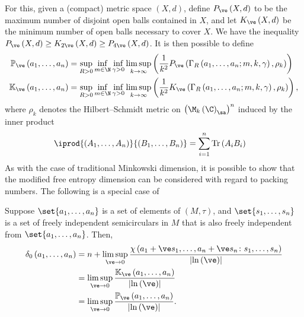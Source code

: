 \documentclass[10pt]{mypackage}
\begin{document}
For this, given a (compact) metric space $\left( X,d \right)$, define $P_{\ve}\left( X,d \right)$ to be the maximum number of disjoint open balls contained in $X$, and let $K_{\ve}\left( X,d \right)$ be the minimum number of open balls necessary to cover $X$. We have the inequality $P_{\ve}\left( X,d \right) \geq K_{2\ve}\left( X,d \right)\geq P_{4\ve}\left( X,d \right)$. It is then possible to define
\begin{align*}
  \mathbb{P}_{\ve}\left( a_1,\dots,a_n \right) &= \sup_{R > 0}\inf_{m\in\N}\inf_{\gamma > 0}\limsup_{k\rightarrow\infty}\left( \frac{1}{k^2}P_{\ve}\left( \Gamma_{R}\left( a_1,\dots,a_n;m,k,\gamma \right),\rho_k \right) \right)\\
  \mathbb{K}_{\ve}\left( a_1,\dots,a_n \right) &= \sup_{R > 0}\inf_{m\in\N}\inf_{\gamma > 0}\limsup_{k\rightarrow\infty}\left( \frac{1}{k^2}K_{\ve}\left( \Gamma_{R}\left( a_1,\dots,a_n;m,k,\gamma \right),\rho_k \right) \right),
\end{align*}
where $\rho_k$ denotes the Hilbert--Schmidt metric on $\left( \M_k\left( \C \right)_{\sa} \right)^{n}$ induced by the inner product
\begin{align*}
  \iprod{\left( A_1,\dots,A_n \right)}{\left( B_1,\dots,B_n \right)} &= \sum_{i=1}^{n} \operatorname{Tr}\left( A_iB_i \right)
\end{align*}
As with the case of traditional Minkowski dimension, it is possible to show that the modified free entropy dimension can be considered with regard to packing numbers. The following is a special case of \cite[Lemma 2.2]{jung_free_entropy_dimension}
\begin{corollary}
  Suppose $\set{a_1,\dots,a_n}$ is a set of elements of $\left( M,\tau \right)$, and $\set{s_1,\dots,s_n}$ is a set of freely independent semicirculars in $M$ that is also freely independent from $\set{a_1,\dots,a_n}$. Then,
  \begin{align*}
    \delta_0\left( a_1,\dots,a_n \right) &= n + \limsup_{\ve\rightarrow 0} \frac{\chi\left( a_1 + \ve s_1,\dots,a_n + \ve s_n \colon s_1,\dots,s_n \right)}{\left\vert \ln\left( \ve \right) \right\vert}\\
                                         &= \limsup_{\ve\rightarrow 0} \frac{ \mathbb{K}_{\ve}\left( a_1,\dots,a_n \right) }{ \left\vert \ln\left( \ve \right) \right\vert }\\
                                         &= \limsup_{\ve\rightarrow 0} \frac{ \mathbb{P}_{\ve}\left( a_1,\dots,a_n \right) }{ \left\vert \ln\left( \ve \right) \right\vert }.
  \end{align*}
\end{corollary}
\end{document}
